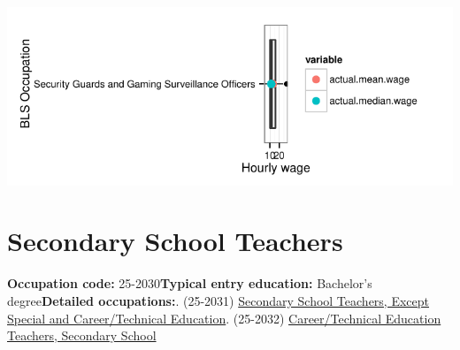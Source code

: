 \documentclass[a4paper,10pt]{article}\usepackage[]{graphicx}\usepackage[]{color}
\makeatletter
\def\maxwidth{ %
  \ifdim\Gin@nat@width>\linewidth
    \linewidth
  \else
    \Gin@nat@width
  \fi
}
\makeatother
\begin{document}
{\centering \includegraphics[width=\maxwidth]{figure/unnamed-chunk-227} 

}


\newpage\section{Secondary School Teachers}\textbf{Occupation code:} 25-2030\newline\textbf{Typical entry education:} Bachelor's degree\newline\textbf{Detailed occupations:}. (25-2031)  \href{http://www.bls.gov/oes/current/oes252031.htm}{Secondary School Teachers, Except Special and Career/Technical Education}. (25-2032)  \href{http://www.bls.gov/oes/current/oes252032.htm}{Career/Technical Education Teachers, Secondary School}\newline%
\end{document}
